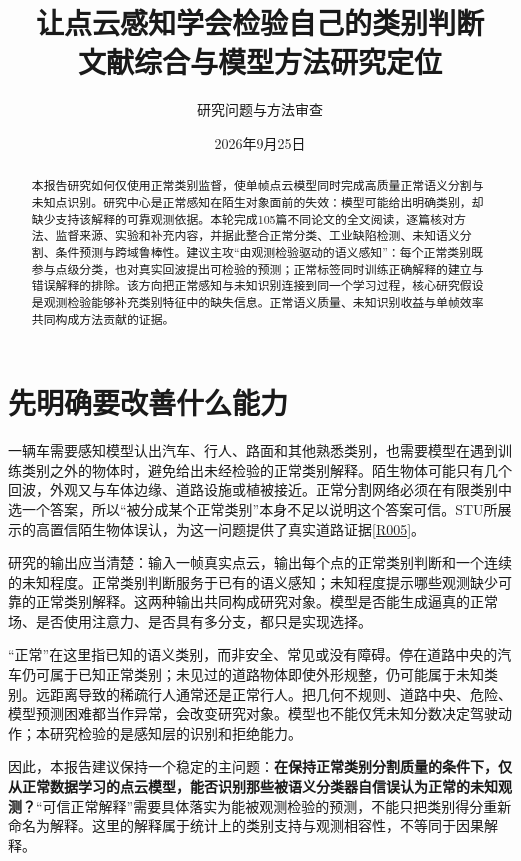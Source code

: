 \documentclass[11pt,a4paper]{article}
\title{让点云感知学会检验自己的类别判断\\文献综合与模型方法研究定位}
\author{研究问题与方法审查}
\date{2026年9月25日}
\newcommand{\paper}[1]{\allowbreak\hyperlink{#1}{[#1]}\allowbreak}
\newcommand{\ReadCount}{105}
\begin{document}
\maketitle

\begin{abstract}
本报告研究如何仅使用正常类别监督，使单帧点云模型同时完成高质量正常语义分割与未知点识别。研究中心是正常感知在陌生对象面前的失效：模型可能给出明确类别，却缺少支持该解释的可靠观测依据。本轮完成\ReadCount{}篇不同论文的全文阅读，逐篇核对方法、监督来源、实验和补充内容，并据此整合正常分类、工业缺陷检测、未知语义分割、条件预测与跨域鲁棒性。建议主攻“由观测检验驱动的语义感知”：每个正常类别既参与点级分类，也对真实回波提出可检验的预测；正常标签同时训练正确解释的建立与错误解释的排除。该方向把正常感知与未知识别连接到同一个学习过程，核心研究假设是观测检验能够补充类别特征中的缺失信息。正常语义质量、未知识别收益与单帧效率共同构成方法贡献的证据。
\end{abstract}

\section{先明确要改善什么能力}

一辆车需要感知模型认出汽车、行人、路面和其他熟悉类别，也需要模型在遇到训练类别之外的物体时，避免给出未经检验的正常类别解释。陌生物体可能只有几个回波，外观又与车体边缘、道路设施或植被接近。正常分割网络必须在有限类别中选一个答案，所以“被分成某个正常类别”本身不足以说明这个答案可信。STU所展示的高置信陌生物体误认，为这一问题提供了真实道路证据\paper{R005}。

研究的输出应当清楚：输入一帧真实点云，输出每个点的正常类别判断和一个连续的未知程度。正常类别判断服务于已有的语义感知；未知程度提示哪些观测缺少可靠的正常类别解释。这两种输出共同构成研究对象。模型是否能生成逼真的正常场、是否使用注意力、是否具有多分支，都只是实现选择。

“正常”在这里指已知的语义类别，而非安全、常见或没有障碍。停在道路中央的汽车仍可属于已知正常类别；未见过的道路物体即使外形规整，仍可能属于未知类别。远距离导致的稀疏行人通常还是正常行人。把几何不规则、道路中央、危险、模型预测困难都当作异常，会改变研究对象。模型也不能仅凭未知分数决定驾驶动作；本研究检验的是感知层的识别和拒绝能力。

因此，本报告建议保持一个稳定的主问题：\textbf{在保持正常类别分割质量的条件下，仅从正常数据学习的点云模型，能否识别那些被语义分类器自信误认为正常的未知观测？}“可信正常解释”需要具体落实为能被观测检验的预测，不能只把类别得分重新命名为解释。这里的解释属于统计上的类别支持与观测相容性，不等同于因果解释。
\end{document}
